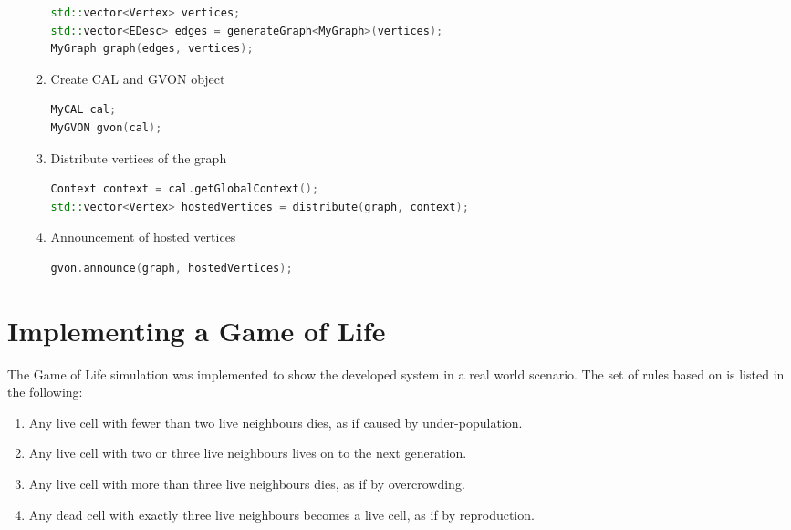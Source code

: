 \begin{enumerate}
\begin{enumerate}
  \begin{lstlisting}[language=C++, label=lst:, style=types]
std::vector<Vertex> vertices;
std::vector<EDesc> edges = generateGraph<MyGraph>(vertices);
MyGraph graph(edges, vertices);
  \end{lstlisting}

\item Create CAL and GVON object

  \begin{lstlisting}[language=C++, label=lst:, style=types]
MyCAL cal;
MyGVON gvon(cal);
  \end{lstlisting}

\item Distribute vertices of the graph

  \begin{lstlisting}[language=C++, label=lst:, style=types]
Context context = cal.getGlobalContext();
std::vector<Vertex> hostedVertices = distribute(graph, context);
  \end{lstlisting}

\item Announcement of hosted vertices
  \begin{lstlisting}[language=C++, label=lst:, style=types]
gvon.announce(graph, hostedVertices);
  \end{lstlisting}
  \end{enumerate}
\end{enumerate}

\section{Implementing a Game of Life}
\label{sec:gol_imp}
The Game of Life simulation was implemented to show the developed
system in a real world scenario. The set of rules based on \cite{ref:gol_rules}
is listed in the following:

\begin{enumerate}
\item Any live cell with fewer than two live neighbours dies, as if caused by under-population.
\item Any live cell with two or three live neighbours lives on to the next generation.
\item Any live cell with more than three live neighbours dies, as if by overcrowding.
\item Any dead cell with exactly three live neighbours becomes a live cell, as if by reproduction.
\end{enumerate}

